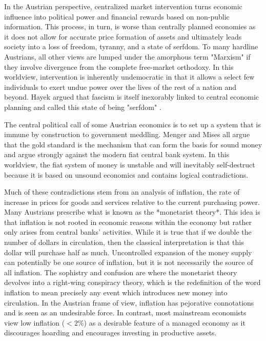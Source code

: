 In the Austrian perspective, centralized market intervention turns economic
influence into political power and financial rewards based on non-public
information. This process, in turn, is worse than centrally planned economies as
it does not allow for accurate price formation of assets and ultimately leads
society into a loss of freedom, tyranny, and a state of serfdom. To many
hardline Austrians, all other views are lumped under the amorphous term
"Marxism" if they involve divergence from the complete free-market orthodoxy. In
this worldview, intervention is inherently undemocratic in that it allows a
select few individuals to exert undue power over the lives of the rest of a
nation and beyond. Hayek argued that fascism is itself inexorably linked to
central economic planning and called this state of being "serfdom"
\cite{golumbia2015bitcoin, golumbia2013cyberlibertarianism}.


The central political call of some Austrian economics is to set up a system that
is immune by construction to government meddling. Menger and Mises all argue
that the gold standard is the mechanism that can form the basis for sound money
and argue strongly against the modern fiat central bank system. In this
worldview, the fiat system of money is unstable and will inevitably
self-destruct because it is based on unsound economics and contains logical
contradictions.

Much of these contradictions stem from an analysis of inflation, the rate of
increase in prices for goods and services relative to the current purchasing
power. Many Austrians prescribe what is known as the *monetarist theory*. This
idea is that inflation is not rooted in economic reasons within the economy but
rather only arises from central banks' activities. While it is true that if we
double the number of dollars in circulation, then the classical interpretation
is that this dollar will purchase half as much. Uncontrolled expansion of the
money supply can potentially be one source of inflation, but it is not
necessarily the source of all inflation. \cite{frisch1983theories} The
sophistry and confusion are where the monetarist theory devolves into a
right-wing conspiracy theory, which is the redefinition of the word inflation to
mean precisely any event which introduces new money into circulation. In the
Austrian frame of view, inflation has pejorative connotations and is seen as an
undesirable force. In contrast, most mainstream economists view low inflation
($<2\%$) as a desirable feature of a managed economy as it discourages hoarding
and encourages investing in productive assets.


